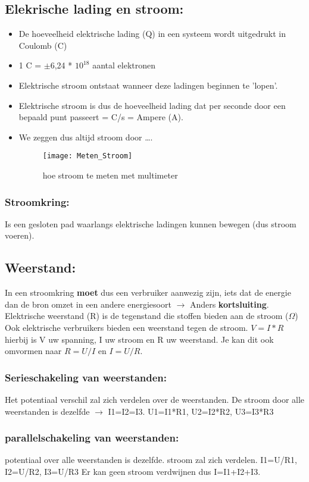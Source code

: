 \documentclass[12pt]{article}
\begin{document}
\subsection{Elekrische lading en stroom:}
\begin{itemize}
    \item De hoeveelheid elektrische lading (Q) in een systeem wordt uitgedrukt in Coulomb (C)
    \item 1 C = $\pm$6,24 * $10^18$ aantal elektronen
    \item Elektrische stroom ontstaat wanneer deze ladingen beginnen te 'lopen'.
    \item Elektrische stroom is dus de hoeveelheid lading dat per seconde door een bepaald punt passeert = C/s = Ampere (A).
    \item We zeggen dus altijd stroom door \dots .
    \begin{figure}[ht]
        \centering
        \texttt{[image: Meten\_Stroom]}
    \caption{hoe stroom te meten met multimeter}
    \end{figure}
\end{itemize}
\subsubsection{\textbf{Stroomkring:}}
Is een gesloten pad waarlangs elektrische ladingen kunnen bewegen (dus stroom voeren).
\subsection{Weerstand:}
In een stroomkring \textbf{moet} dus een verbruiker aanwezig zijn, iets dat de energie dan de bron omzet in een andere energiesoort $\rightarrow$ Anders \textbf{kortsluiting}.
Elektrische weerstand (R) is de tegenstand die stoffen bieden aan de stroom ($\Omega$)
Ook elektrische verbruikers bieden een weerstand tegen de stroom.
$V = I*R$ hierbij is V uw spanning, I uw stroom en R uw weerstand.
Je kan dit ook omvormen naar $R= U/I$ en $I=U/R$.
\subsubsection{\textbf{Serieschakeling van weerstanden:}}
Het potentiaal verschil zal zich verdelen over de weerstanden.
De stroom door alle weerstanden is dezelfde $\rightarrow$ I1=I2=I3.
U1=I1*R1, 
U2=I2*R2, 
U3=I3*R3 
\subsubsection{\textbf{parallelschakeling van weerstanden:}}
potentiaal over alle weerstanden is dezelfde.
stroom zal zich verdelen.
I1=U/R1,
I2=U/R2,
I3=U/R3
Er kan geen stroom verdwijnen dus I=I1+I2+I3.
\end{document}
